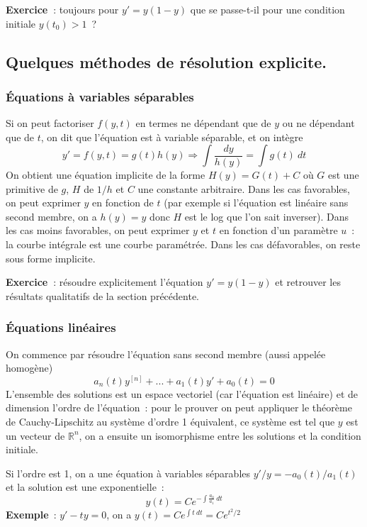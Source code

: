 \documentclass[a4paper,11pt]{article}
\newcommand{\R}{{\mathbb{R}}}
\begin{document}
\begin{giacjshere}
{\bf Exercice~}: toujours pour $y'=y(1-y)$ que se passe-t-il pour une
condition initiale $y(t_0)>1$~?

\subsection{Quelques m\'ethodes de r\'esolution explicite.}

\subsubsection{\'Equations \`a variables
  s\'eparables}
Si on peut factoriser $f(y,t)$ en termes ne d\'ependant que
de $y$ ou ne d\'ependant que de $t$, on dit que l'\'equation
est \`a variable s\'eparable, et on int\`egre
$$ y'=f(y,t)=g(t)h(y) \Rightarrow \int \frac{dy}{h(y)} = \int g(t) \
dt$$
On obtient une \'equation implicite de la forme $H(y)=G(t)+C$ o\`u
$G$ est une primitive de $g$, $H$ de $1/h$ et $C$ une constante
arbitraire. Dans les cas favorables, on peut exprimer $y$ en fonction
de $t$ (par exemple si l'\'equation est lin\'eaire sans second membre,
on a $h(y)=y$ donc $H$ est le log que l'on sait
inverser). Dans les cas moins favorables, on peut exprimer $y$ et
$t$ en fonction d'un param\`etre $u$~: la courbe int\'egrale est
une courbe param\'etr\'ee. Dans les cas d\'efavorables, on reste
sous forme implicite.

{\bf Exercice~}: r\'esoudre explicitement l'\'equation $y'=y(1-y)$
et retrouver les r\'esultats qualitatifs de la section pr\'ec\'edente.

\subsubsection{\'Equations lin\'eaires}
On commence par r\'esoudre l'\'equation sans second membre
(aussi appel\'ee homog\`ene)
$$ a_n(t) y^{[n]} +...+a_1(t)y'+a_0(t)=0$$
 L'ensemble
des solutions est un espace vectoriel (car l'\'equation
est lin\'eaire) et de dimension l'ordre de
l'\'equation~: pour le prouver on peut appliquer le th\'eor\`eme
de Cauchy-Lipschitz au syst\`eme d'ordre 1 \'equivalent, ce
syst\`eme est tel que $y$ est un vecteur de $\R^n$, on a ensuite
un isomorphisme entre les solutions et la condition initiale.

Si l'ordre est 1, on a une \'equation \`a variables s\'eparables
$ y'/y=-a_0(t)/a_1(t)$ et la solution est une exponentielle~:
$$ y(t)=Ce^{-\int \frac{a_0}{a_1} \ dt}$$
{\bf Exemple}~: $y'-ty=0$, on a $y(t)=Ce^{\int t \ dt}=Ce^{t^2/2}$


\end{giacjshere}
\end{document}
